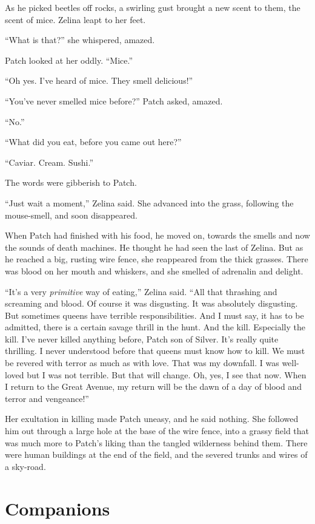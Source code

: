 \documentclass[ebook,oneside,openany,12pt]{memoir}
\begin{document}
As he picked beetles off rocks, a swirling gust brought a new scent to
them, the scent of mice. Zelina leapt to her feet.

“What is that?” she whispered, amazed.

Patch looked at her oddly. “Mice.”

“Oh yes. I’ve heard of mice. They smell delicious!”

“You’ve never smelled mice before?” Patch asked, amazed.

“No.”

“What did you eat, before you came out here?”

“Caviar. Cream. Sushi.”

The words were gibberish to Patch.

“Just wait a moment,” Zelina said. She advanced into the grass,
following the mouse-smell, and soon disappeared.

When Patch had finished with his food, he moved on, towards the smells
and now the sounds of death machines. He thought he had seen the last
of Zelina. But as he reached a big, rusting wire fence, she reappeared
from the thick grasses. There was blood on her mouth and whiskers, and
she smelled of adrenalin and delight.

“It’s a very \emph{primitive} way of eating,” Zelina said. “All that
thrashing and screaming and blood. Of course it was disgusting. It was
absolutely disgusting. But sometimes queens have terrible
responsibilities. And I must say, it has to be admitted, there is a
certain savage thrill in the hunt. And the kill. Especially the
kill. I’ve never killed anything before, Patch son of Silver. It’s
really quite thrilling. I never understood before that queens must
know how to kill. We must be revered with terror as much as with
love. That was my downfall. I was well-loved but I was not
terrible. But that will change. Oh, yes, I see that now. When I return
to the Great Avenue, my return will be the dawn of a day of blood and
terror and vengeance!”

Her exultation in killing made Patch uneasy, and he said nothing. She
followed him out through a large hole at the base of the wire fence,
into a grassy field that was much more to Patch’s liking than the
tangled wilderness behind them. There were human buildings at the end
of the field, and the severed trunks and wires of a sky-road.


\section{Companions}
\end{document}
